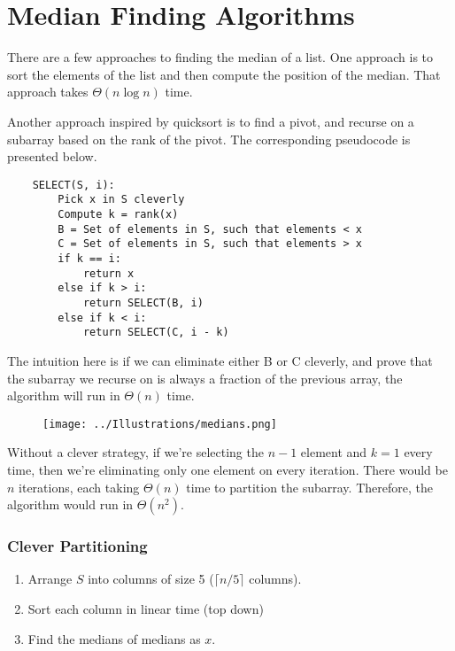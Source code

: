 \documentclass[12pt]{article}
\newcommand\ceil[1]{\lceil#1\rceil}
\begin{document}
\section*{Median Finding Algorithms}
\par{There are a few approaches to finding the median of a list.  One approach is to sort the elements of the list and then compute the position of the median. That approach takes $\Theta(n \log{n})$ time.}
\par{Another approach inspired by quicksort is to find a pivot, and recurse on a subarray based on the rank of the pivot. The corresponding pseudocode is presented below.}

\begin{lstlisting}
	SELECT(S, i):
		Pick x in S cleverly
		Compute k = rank(x)
		B = Set of elements in S, such that elements < x
		C = Set of elements in S, such that elements > x
		if k == i:
			return x
		else if k > i:
			return SELECT(B, i)
		else if k < i:
			return SELECT(C, i - k)	
\end{lstlisting}

\par{The intuition here is if we can eliminate either B or C cleverly, and prove that the subarray we recurse on is always a fraction of the previous array, the algorithm will run in $\Theta(n)$ time.}

\begin{figure}[h]
	\texttt{[image: ../Illustrations/medians.png]}
	\centering
\end{figure}

Without a clever strategy, if we’re selecting the $n - 1$ element and $k = 1$ every time, then we’re eliminating only one element on every iteration. There would be $n$ iterations, each taking $\Theta(n)$ time to partition the subarray. Therefore, the algorithm would run in $\Theta(n^2)$.

\subsubsection*{Clever Partitioning}
\begin{enumerate}
\item Arrange $S$ into columns of size 5 ($\ceil{n / 5}$ columns).
\item Sort each column in linear time (top down)
\item Find the medians of medians as $x$.
\end{enumerate}
\end{document}
